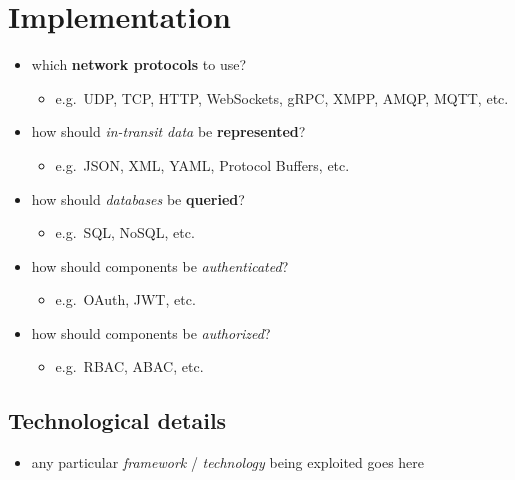 \documentclass{scrartcl}
\begin{document}
\section{Implementation}\label{implementation}

\begin{itemize}
  \item which \textbf{network protocols} to use?

  \begin{itemize}
    \item e.g.~UDP, TCP, HTTP, WebSockets, gRPC, XMPP, AMQP, MQTT, etc.
  \end{itemize}
  \item how should \emph{in-transit data} be \textbf{represented}?

  \begin{itemize}
    \item e.g.~JSON, XML, YAML, Protocol Buffers, etc.
  \end{itemize}
  \item how should \emph{databases} be \textbf{queried}?

  \begin{itemize}
    \item e.g.~SQL, NoSQL, etc.
  \end{itemize}
  \item how should components be \emph{authenticated}?

  \begin{itemize}
    \item e.g.~OAuth, JWT, etc.
  \end{itemize}
  \item how should components be \emph{authorized}?

  \begin{itemize}
    \item e.g.~RBAC, ABAC, etc.
  \end{itemize}
\end{itemize}

\subsection{Technological details}\label{technological-details}

\begin{itemize}
  \item any particular \emph{framework} / \emph{technology} being exploited
  goes here
\end{itemize}
\end{document}
